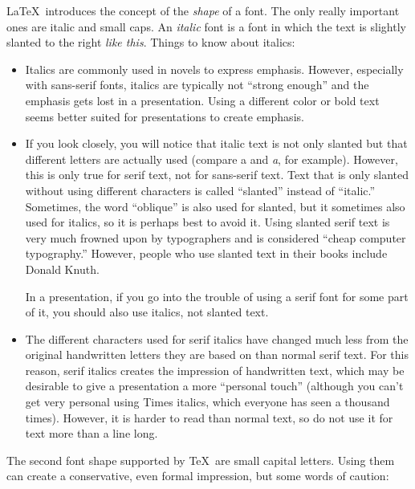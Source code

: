 \LaTeX\ introduces the concept of the \emph{shape} of a font. The only
really important ones are italic and small caps.
An \emph{italic} font is a font in which the text is slightly slanted
to the right \emph{like this}. Things to know about
italics:
\begin{itemize}
\item
  Italics are commonly used in novels to express emphasis. However,
  especially with sans-serif fonts, italics are typically not ``strong
  enough'' and the emphasis gets lost in a presentation. Using a
  different color or bold text seems better suited for presentations
  to create emphasis. 
\item
  If you look closely, you will notice that italic text is not only
  slanted but that different letters are actually used (compare a and
  \emph{a}, for example). However, this is only true for serif text,
  not for sans-serif text. Text that is only slanted without using
  different characters is called  ``slanted'' instead of ``italic.''
  Sometimes, the word ``oblique'' is also used for slanted, but it
  sometimes also used for italics, so it is perhaps best to avoid
  it. Using slanted serif text is very much frowned upon by
  typographers and is considered ``cheap computer typography.''
  However, people who use slanted text in their books include Donald
  Knuth.

  In a presentation, if you go into the trouble of using a serif font
  for some part of it, you should also use italics, not slanted text.
\item
  The different characters used for serif italics have changed much
  less  from the original handwritten letters they are based on than
  normal serif text. For this reason, serif italics creates the
  impression of handwritten text, which may be desirable to give a
  presentation a more ``personal touch'' (although you can't get very
  personal using Times italics, which everyone has seen a thousand
  times). However, it is harder to read than normal text, so do not
  use it for text more than a line long.
\end{itemize}

The second font shape supported by \TeX\ are small capital
letters. Using them can create a conservative, even formal
impression, but some words of caution:

